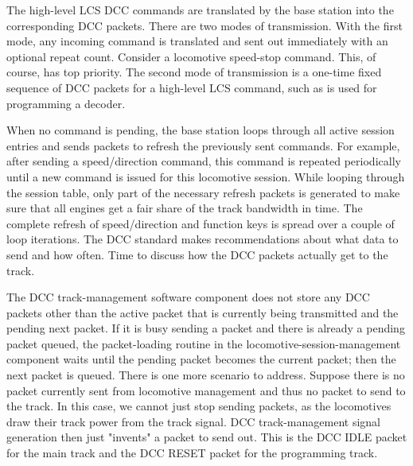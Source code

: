 \begin{center}
\end{center}

The high-level LCS DCC commands are translated by the base station into the corresponding DCC packets. There are two modes of transmission. With the first mode, any incoming command is translated and sent out immediately with an optional repeat count. Consider a locomotive speed-stop command. This, of course, has top priority. The second mode of transmission is a one-time fixed sequence of DCC packets for a high-level LCS command, such as is used for programming a decoder.

When no command is pending, the base station loops through all active session entries and sends packets to refresh the previously sent commands. For example, after sending a speed/direction command, this command is repeated periodically until a new command is issued for this locomotive session. While looping through the session table, only part of the necessary refresh packets is generated to make sure that all engines get a fair share of the track bandwidth in time. The complete refresh of speed/direction and function keys is spread over a couple of loop iterations. The DCC standard makes recommendations about what data to send and how often. Time to discuss how the DCC packets actually get to the track.


The DCC track-management software component does not store any DCC packets other than the active packet that is currently being transmitted and the pending next packet. If it is busy sending a packet and there is already a pending packet queued, the packet-loading routine in the locomotive-session-management component waits until the pending packet becomes the current packet; then the next packet is queued. There is one more scenario to address. Suppose there is no packet currently sent from locomotive management and thus no packet to send to the track. In this case, we cannot just stop sending packets, as the locomotives draw their track power from the track signal. DCC track-management signal generation then just "invents" a packet to send out. This is the DCC IDLE packet for the main track and the DCC RESET packet for the programming track.

